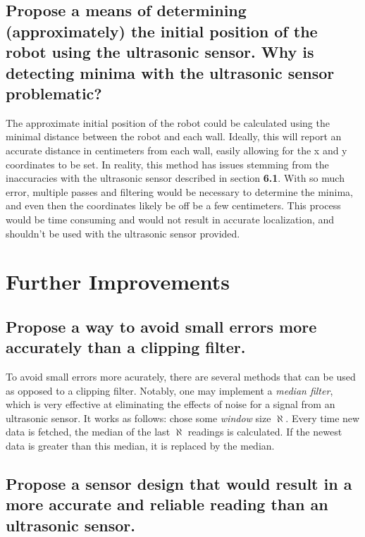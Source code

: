 \documentclass[11pt]{article}
\begin{document}
\subsection{Propose a means of determining (approximately) the initial position of the robot using
the ultrasonic sensor. Why is detecting minima with the ultrasonic sensor problematic?}
\par The approximate initial position of the robot could be calculated using the minimal distance
between the robot and each wall. Ideally, this will report an accurate distance in centimeters from
each wall, easily allowing for the x and y coordinates to be set. In reality, this method has issues
stemming from the inaccuracies with the ultrasonic sensor described in section \textbf{6.1}. With so
much error, multiple passes and filtering would be necessary to determine the minima, and even then
the coordinates likely be off be a few centimeters. This process would be time consuming and would
not result in accurate localization, and shouldn't be used with the ultrasonic sensor provided.

\section{Further Improvements}
\subsection{Propose a way to avoid small errors more accurately than a clipping filter.}
To avoid small errors more acurately, there are several methods that can be used as opposed to a
clipping filter. Notably, one may implement a \textit{median filter}, which is very effective at
eliminating the effects of noise for a signal from an ultrasonic sensor. It works as follows: chose
some \textit{window} size $\aleph$. Every time new data is fetched, the median of the last $\aleph$
readings is calculated. If the newest data is greater than this median, it is replaced by the
median.

\subsection{Propose a sensor design that would result in a more accurate and reliable reading than
an ultrasonic sensor.}
\end{document}
